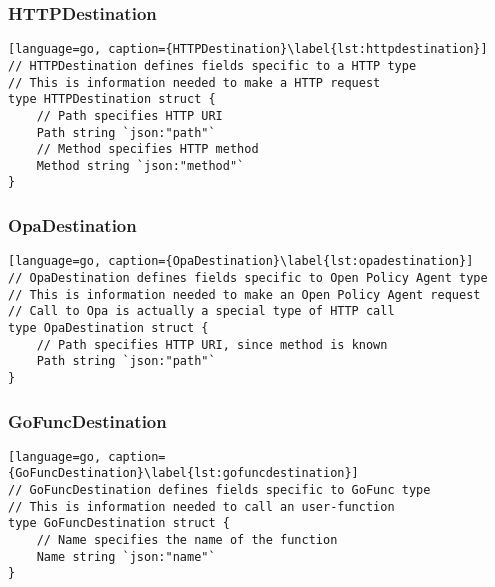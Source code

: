 \subsubsection{HTTPDestination}
\begin{lstlisting}[language=go, caption={HTTPDestination}\label{lst:httpdestination}]
// HTTPDestination defines fields specific to a HTTP type
// This is information needed to make a HTTP request
type HTTPDestination struct {
	// Path specifies HTTP URI
	Path string `json:"path"`
	// Method specifies HTTP method
	Method string `json:"method"`
}
\end{lstlisting}

\subsubsection{OpaDestination}
\begin{lstlisting}[language=go, caption={OpaDestination}\label{lst:opadestination}]
// OpaDestination defines fields specific to Open Policy Agent type
// This is information needed to make an Open Policy Agent request
// Call to Opa is actually a special type of HTTP call
type OpaDestination struct {
	// Path specifies HTTP URI, since method is known
	Path string `json:"path"`
}
\end{lstlisting}

\subsubsection{GoFuncDestination}
\begin{lstlisting}[language=go, caption={GoFuncDestination}\label{lst:gofuncdestination}]
// GoFuncDestination defines fields specific to GoFunc type
// This is information needed to call an user-function
type GoFuncDestination struct {
	// Name specifies the name of the function
	Name string `json:"name"`
}
\end{lstlisting}

